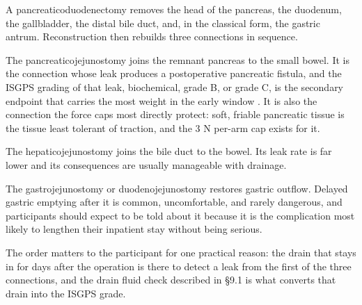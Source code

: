 A pancreaticoduodenectomy removes the head of the pancreas, the duodenum, the
gallbladder, the distal bile duct, and, in the classical form, the gastric
antrum. Reconstruction then rebuilds three connections in sequence.

The pancreaticojejunostomy joins the remnant pancreas to the small bowel. It is
the connection whose leak produces a postoperative pancreatic fistula, and the
ISGPS grading of that leak, biochemical, grade B, or grade C, is the secondary
endpoint that carries the most weight in the early window \cite{Bassi2017}. It is
also the connection the force caps most directly protect: soft, friable
pancreatic tissue is the tissue least tolerant of traction, and the 3 N per-arm
cap exists for it.

The hepaticojejunostomy joins the bile duct to the bowel. Its leak rate is far
lower and its consequences are usually manageable with drainage.

The gastrojejunostomy or duodenojejunostomy restores gastric outflow. Delayed
gastric emptying after it is common, uncomfortable, and rarely dangerous, and
participants should expect to be told about it because it is the complication
most likely to lengthen their inpatient stay without being serious.

The order matters to the participant for one practical reason: the drain that
stays in for days after the operation is there to detect a leak from the first
of the three connections, and the drain fluid check described in \S 9.1 is what
converts that drain into the ISGPS grade.
